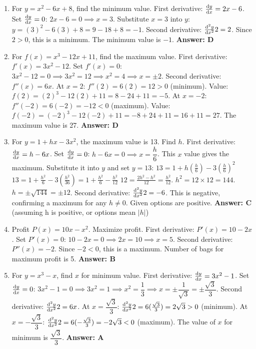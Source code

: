 \begin{enumerate}[label={\arabic*.}]
  \item For \(y = x^2 - 6x + 8\), find the minimum value.
    First derivative: \(\frac{\mathrm{d}y}{\mathrm{d}x} = 2x - 6\).
    Set \(\frac{\mathrm{d}y}{\mathrm{d}x} = 0\): \(2x - 6 = 0 \implies x = 3\).
    Substitute \(x=3\) into \(y\): \(y = (3)^2 - 6(3) + 8 = 9 - 18 + 8 = -1\).
    Second derivative: \(\frac{\mathrm{d}^2 y}{\mathrm{d} x^2}{2} = 2\). Since \(2 > 0\), this is a minimum. The minimum value is \(-1\).
    \textbf{Answer: D}

  \item For \(f(x) = x^3 - 12x + 11\), find the maximum value.
    First derivative: \(f'(x) = 3x^2 - 12\).
    Set \(f'(x) = 0\): \(3x^2 - 12 = 0 \implies 3x^2 = 12 \implies x^2 = 4 \implies x = \pm 2\).
    Second derivative: \(f''(x) = 6x\).
    At \(x=2\): \(f''(2) = 6(2) = 12 > 0\) (minimum). Value: \(f(2) = (2)^3 - 12(2) + 11 = 8 - 24 + 11 = -5\).
    At \(x=-2\): \(f''(-2) = 6(-2) = -12 < 0\) (maximum). Value: \(f(-2) = (-2)^3 - 12(-2) + 11 = -8 + 24 + 11 = 16 + 11 = 27\).
    The maximum value is 27.
    \textbf{Answer: D}

  \item For \(y = 1 + hx - 3x^2\), the maximum value is 13. Find \(h\).
    First derivative: \(\frac{\mathrm{d}y}{\mathrm{d}x} = h - 6x\).
    Set \(\frac{\mathrm{d}y}{\mathrm{d}x} = 0\): \(h - 6x = 0 \implies x = \dfrac{h}{6}\).
    This \(x\) value gives the maximum. Substitute it into \(y\) and set \(y=13\):
    \(13 = 1 + h(\frac{h}{6}) - 3(\frac{h}{6})^2\)
    \(13 = 1 + \frac{h^2}{6} - 3(\frac{h^2}{36}) = 1 + \frac{h^2}{6} - \frac{h^2}{12}\)
    \(12 = \frac{2h^2 - h^2}{12} = \frac{h^2}{12}\).
    \(h^2 = 12 \times 12 = 144\).
    \(h = \pm \sqrt{144} = \pm 12\).
    Second derivative: \(\frac{\mathrm{d}^2 y}{\mathrm{d} x^2}{2} = -6\). This is negative, confirming a maximum for any \(h \neq 0\).
    Given options are positive.
    \textbf{Answer: C} (assuming h is positive, or options mean \(|h|\))

  \item Profit \(P(x) = 10x - x^2\). Maximize profit.
    First derivative: \(P'(x) = 10 - 2x\).
    Set \(P'(x) = 0\): \(10 - 2x = 0 \implies 2x = 10 \implies x = 5\).
    Second derivative: \(P''(x) = -2\). Since \(-2 < 0\), this is a maximum.
    Number of bags for maximum profit is 5.
    \textbf{Answer: B}

  \item For \(y = x^3 - x\), find \(x\) for minimum value.
    First derivative: \(\frac{\mathrm{d}y}{\mathrm{d}x} = 3x^2 - 1\).
    Set \(\frac{\mathrm{d}y}{\mathrm{d}x} = 0\): \(3x^2 - 1 = 0 \implies 3x^2 = 1 \implies x^2 = \dfrac{1}{3} \implies x = \pm \dfrac{1}{\sqrt{3}} = \pm \dfrac{\sqrt{3}}{3}\).
    Second derivative: \(\frac{\mathrm{d}^2 y}{\mathrm{d} x^2}{2} = 6x\).
    At \(x = \dfrac{\sqrt{3}}{3}\): \(\frac{\mathrm{d}^2 y}{\mathrm{d} x^2}{2} = 6(\frac{\sqrt{3}}{3}) = 2\sqrt{3} > 0\) (minimum).
    At \(x = -\dfrac{\sqrt{3}}{3}\): \(\frac{\mathrm{d}^2 y}{\mathrm{d} x^2}{2} = 6(-\frac{\sqrt{3}}{3}) = -2\sqrt{3} < 0\) (maximum).
    The value of \(x\) for minimum is \(\dfrac{\sqrt{3}}{3}\).
    \textbf{Answer: A}


\end{enumerate}
